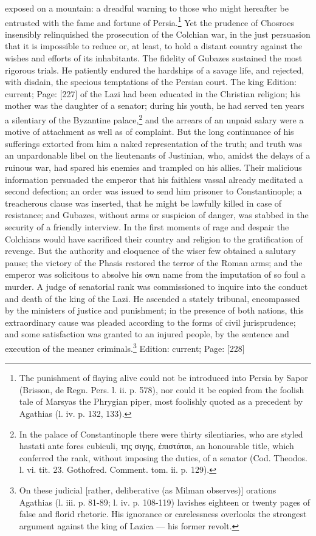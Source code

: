 exposed on a mountain: a dreadful warning to those who might hereafter be entrusted with the fame and fortune of Persia.\footnote{The punishment of flaying alive could not be introduced into Persia by Sapor (Brisson, de Regn. Pers. l. ii. p. 578), nor could it be copied from the foolish tale of Marsyas the Phrygian piper, most foolishly quoted as a precedent by Agathias (l. iv. p. 132, 133).} Yet the prudence of Chosroes insensibly relinquished the prosecution of the Colchian war, in the just persuasion that it is impossible to reduce or, at least, to hold a distant country against the wishes and efforts of its inhabitants. The fidelity of Gubazes sustained the most rigorous trials. He patiently endured the hardships of a savage life, and rejected, with disdain, the specious temptations of the Persian court. The king Edition: current; Page: [227] of the Lazi had been educated in the Christian religion; his mother was the daughter of a senator; during his youth, he had served ten years a silentiary of the Byzantine palace,\footnote{In the palace of Constantinople there were thirty silentiaries, who are styled hastati ante fores cubiculi, \textgreek{της σιγης, \texthebrew{ἐ}πιστάται}, an honourable title, which conferred the rank, without imposing the duties, of a senator (Cod. Theodos. l. vi. tit. 23. Gothofred. Comment. tom. ii. p. 129).} and the arrears of an unpaid salary were a motive of attachment as well as of complaint. But the long continuance of his sufferings extorted from him a naked representation of the truth; and truth was an unpardonable libel on the lieutenants of Justinian, who, amidst the delays of a ruinous war, had spared his enemies and trampled on his allies. Their malicious information persuaded the emperor that his faithless vassal already meditated a second defection; an order was issued to send him prisoner to Constantinople; a treacherous clause was inserted, that he might be lawfully killed in case of resistance; and Gubazes, without arms or suspicion of danger, was stabbed in the security of a friendly interview. In the first moments of rage and despair the Colchians would have sacrificed their country and religion to the gratification of revenge. But the authority and eloquence of the wiser few obtained a salutary pause; the victory of the Phasis restored the terror of the Roman arms; and the emperor was solicitous to absolve his own name from the imputation of so foul a murder. A judge of senatorial rank was commissioned to inquire into the conduct and death of the king of the Lazi. He ascended a stately tribunal, encompassed by the ministers of justice and punishment; in the presence of both nations, this extraordinary cause was pleaded according to the forms of civil jurisprudence; and some satisfaction was granted to an injured people, by the sentence and execution of the meaner criminals.\footnote{On these judicial [rather, deliberative (as Milman observes)] orations Agathias (l. iii. p. 81-89; l. iv. p. 108-119) lavishes eighteen or twenty pages of false and florid rhetoric. His ignorance or carelessness overlooks the strongest argument against the king of Lazica \texthebrew{—} his former revolt.}
Edition: current; Page: [228]

